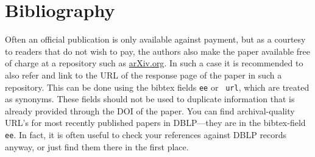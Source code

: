 \documentclass[adraft,copyright,creativecommons]{eptcs}
\begin{document}





\section{Bibliography} %

Often an official publication is only available against payment, but
as a courtesy to readers that do not wish to pay, the authors also
make the paper available free of charge at a repository such as
\url{arXiv.org}. In such a case it is recommended to also refer and
link to the URL of the response page of the paper in such a
repository.  This can be done using the bibtex fields {\tt ee} or {\tt
url}, which are treated as synonyms.  These fields should not be used
to duplicate information that is already provided through the DOI of
the paper.
You can find archival-quality URL's for most recently published papers
in DBLP---they are in the bibtex-field {\tt ee}. In fact, it is often
useful to check your references against DBLP records anyway, or just find
them there in the first place.


\nocite{*}


\end{document}
